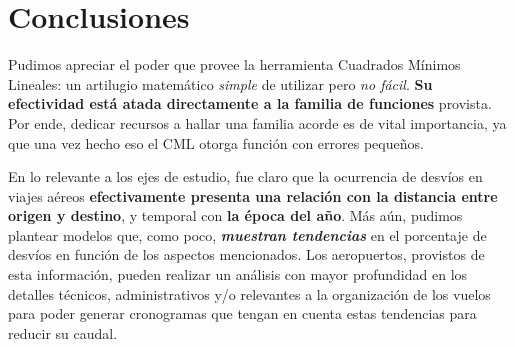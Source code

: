 \section{Conclusiones}

Pudimos apreciar el poder que provee la herramienta Cuadrados M\'inimos Lineales: un artilugio matem\'atico \textit{simple} de utilizar pero \textit{no f\'acil}. \textbf{Su efectividad est\'a atada directamente a la familia de funciones} provista. Por ende, dedicar recursos a hallar una familia acorde es de vital importancia, ya que una vez hecho eso el CML otorga funci\'on con errores peque\~nos. 

En lo relevante a los ejes de estudio, fue claro que la ocurrencia de desv\'ios en viajes a\'ereos \textbf{efectivamente presenta una relaci\'on con la distancia entre origen y destino}, y temporal con \textbf{la \'epoca del a\~no}. M\'as a\'un, pudimos plantear modelos que, como poco, \textit{\textbf{muestran tendencias}} en el porcentaje de desv\'ios en funci\'on de los aspectos mencionados. Los aeropuertos, provistos de esta informaci\'on, pueden realizar un an\'alisis con mayor profundidad en los detalles t\'ecnicos, administrativos y/o relevantes a la organizaci\'on de los vuelos para poder generar cronogramas que tengan en cuenta estas tendencias para reducir su caudal.
